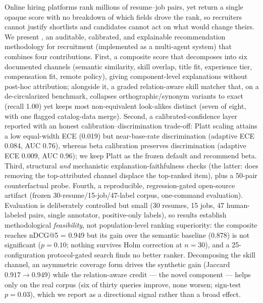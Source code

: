 
Online hiring platforms rank millions of resume--job pairs, yet return a single opaque score with no breakdown of which fields drove the rank, so recruiters cannot justify shortlists and candidates cannot act on what would change theirs. We present \JobMatch, an auditable, calibrated, and explainable recommendation methodology for recruitment (implemented as a multi-agent system) that combines four contributions. First, a composite score that decomposes into six documented channels (semantic similarity, skill overlap, title fit, experience tier, compensation fit, remote policy), giving component-level explanations without post-hoc attribution; alongside it, a graded relation-aware skill matcher that, on a de-circularized benchmark, collapses orthographic/synonym variants to exact (recall 1.00) yet keeps most non-equivalent look-alikes distinct (seven of eight, with one flagged catalog-data merge). Second, a calibrated-confidence layer reported with an honest calibration--discrimination trade-off: Platt scaling attains a low equal-width ECE (0.019) but near-base-rate discrimination (adaptive ECE 0.084, AUC 0.76), whereas beta calibration preserves discrimination (adaptive ECE 0.009, AUC 0.96); we keep Platt as the frozen default and recommend beta. Third, structural \emph{and} mechanistic explanation-faithfulness checks (the latter: does removing the top-attributed channel displace the top-ranked item), plus a 50-pair counterfactual probe. Fourth, a reproducible, regression-gated open-source artifact (frozen 30-resume/15-job/47-label corpus, one-command evaluation).
Evaluation is deliberately controlled but small (30 resumes, 15 jobs, 47 human-labeled pairs, single annotator, positive-only labels), so results establish methodological \emph{feasibility}, not population-level ranking superiority: the composite reaches nDCG@5 = 0.949 but its gain over the semantic baseline (0.878) is not significant ($p = 0.10$; nothing survives Holm correction at $n = 30$), and a 25-configuration protocol-gated search finds no better ranker. Decomposing the skill channel, an asymmetric coverage form drives the synthetic gain (Jaccard $0.917 \rightarrow 0.949$) while the relation-aware credit --- the novel component --- helps only on the real corpus (six of thirty queries improve, none worsen; sign-test $p = 0.03$), which we report as a directional signal rather than a broad effect.

